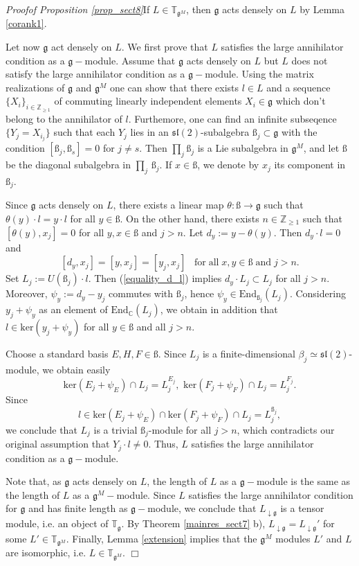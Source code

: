 \documentclass{svmult}
\renewenvironment{proof}{ \emph{Proof}}{$\Box$}
\newcommand {\ZZ} {\mathbb {Z}}
\newcommand {\CC} {\mathbb {C}}
\newcommand{\TT}{\mathbb{T}}
\renewcommand{\sl}{\mathfrak{sl}}
\renewcommand{\gg}{\mathfrak{g}}
\newcommand{\Ker}{\mathrm{ker}}
\newcommand{\End}{\mathrm{End}}
\begin{document}
\begin{proof}\textit{of Proposition \ref{prop_sect8}}\hspace{0.2cm}If $L \in \TT_{\gg^M}$, then $\gg$ acts densely on $L$ by Lemma \ref{corank1}. 

Let now $\gg$ act densely on $L$. We first prove that $L$ satisfies the large annihilator condition as a $\gg-$module. 
Assume that $\gg$ acts densely on $L$ but $L$ does not satisfy the large annihilator condition as a $\gg-$module. Using the matrix realizations of $\gg$ and $\gg^M$
one can show that there exists $l\in L$ and a sequence $\lbrace X_i\rbrace_{i\in\ZZ_{\geq 1}}$ of commuting linearly independent elements  $X_i\in\gg$
which don't belong to the annihilator of $l$. Furthemore, 
one can find an infinite subseqence $\lbrace Y_j=X_{i_j} \rbrace$ such that each $Y_j$ lies in an $\sl(2)$-subalgebra
$\text{\ss}_j\subset\gg$ with the condition
$[\text{\ss}_j,\text{\ss}_s]=0$ for $j\neq s$. Then $\prod_j \text{\ss}_j$ is a Lie subalgebra in $\gg^M$, and let $\text{\ss}$ be the diagonal subalgebra in $\prod_j\,\text{\ss}_j$. 
If $x\in\text{\ss}$, we denote by $x_j$ its component in $\text{\ss}_j$.

Since $\gg$ acts densely on $L$, there exists a linear map $\theta:\text{\ss}\to \gg$ such that $\theta(y)\cdot l=y\cdot l$ for all $y\in\text{\ss}$. 
On the other hand, there exists $n \in \ZZ_{\geq 1}$ such that
$[\theta(y),x_j]=0$ for all $y,x\in\text{\ss}$ and $j>n$. Let $d_y:=y-\theta(y)$. Then $d_y\cdot l=0$ and 
\begin{equation}\label{equality_d_l}
[d_y,x_j]=[y,x_j]=[y_j,x_j]\;\;\;\mathrm{for\;all}\;x,y\in\text{\ss}\;\mathrm{and}\;j>n.
\end{equation}           
Set $L_j:=U(\text{\ss}_j)\cdot l$. Then (\ref{equality_d_l}) implies $d_y\cdot L_j \subset L_j$ for all $j>n$.  
Moreover, $\psi_y:=d_y-y_j$ commutes with $\text{\ss}_j$, hence $\psi_y\in\End_{\text{\ss}_j}(L_j)$. 
Considering $y_j + \psi_y$ as an element of $\End_{\CC}(L_j)$, we obtain in addition that $l\in\Ker (y_j+\psi_y)$ for all $y\in\text{\ss}$ and all $j>n$. 

Choose a standard basis $E,H,F\in\text{\ss}$. Since $L_j$ is a finite-dimensional $\beta_j\simeq\sl(2)$-module, 
we obtain easily
$$\Ker(E_j+\psi_E)\cap L_j=L_j^{E_j},\,\, \Ker(F_j+\psi_F)\cap L_j=L_j^{F_j}.$$
Since
$$l \in \Ker(E_j+\psi_E)\cap \Ker(F_j+\psi_F)\cap L_j=L_j^{\text{\ss}_j},$$ 
we conclude that $L_j$ is a trivial  $\text{\ss}_j$-module for all $j>n$, which contradicts our original assumption that $Y_j\cdot l\neq 0$. 
Thus, $L$ satisfies the large annihilator condition as a $\gg-$module.

Note that, as $\gg$ acts densely on $L$, the length of $L$ as a $\gg-$module is the same as the length of $L$ as a $\gg^M-$module. 
Since $L$ satisfies  the large annihilator condition for $\gg$ and has finite length as $\gg-$module, we conclude that $L_{\downarrow\gg}$ is a tensor module, i.e. 
an object of $\TT_\gg$. By Theorem \ref{mainres_sect7} b), $L_{\downarrow\gg} = L_{\downarrow\gg}'$ for some $L' \in \TT_{\gg^M}$. Finally, Lemma \ref{extension} implies that the $\gg^M$ modules $L'$ and $L$ are isomorphic, i.e. $L\in\TT_{\gg^M}$.
\end{proof}
\end{document}
